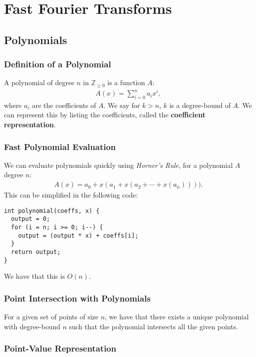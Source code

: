 \documentclass[a4paper, 12pt, twoside]{article}
\begin{document}
\vfill

\section{Fast Fourier Transforms}

\subsection{Polynomials}

\subsubsection{Definition of a Polynomial}

A polynomial of degree $n$ in $\mathbb{Z}_{\geq 0}$ is a function $A$: 
\begin{gather*}
  A(x) = \sum_{i = 0}^n a_ix^i,
\end{gather*} where $a_i$ are the coefficients of $A$. We say for 
$k > n$, $k$ is a degree-bound of $A$. We can represent this by listing
the coefficients, called the \textbf{coefficient representation}.

\newpage

\subsubsection{Fast Polynomial Evaluation}

We can evaluate polynomials quickly using \textit{Horner's Rule},
for a polynomial $A$ degree $n$: \begin{gather*}
  A(x) = a_0 + x(a_1 + x(a_2 + \cdots + x(a_n)))).
\end{gather*} This can be simplified in the following code:
\begin{lstlisting}
int polynomial(coeffs, x) {
  output = 0;
  for (i = n; i >= 0; i--) {
    output = (output * x) + coeffs[i];
  }
  return output;
}
\end{lstlisting} We have that this is $O(n)$.

\subsubsection{Point Intersection with Polynomials}

For a given set of points of size $n$, we have that there exists a 
unique polynomial with degree-bound $n$ such that the polynomial
intersects all the given points.

\subsubsection{Point-Value Representation}
\end{document}

